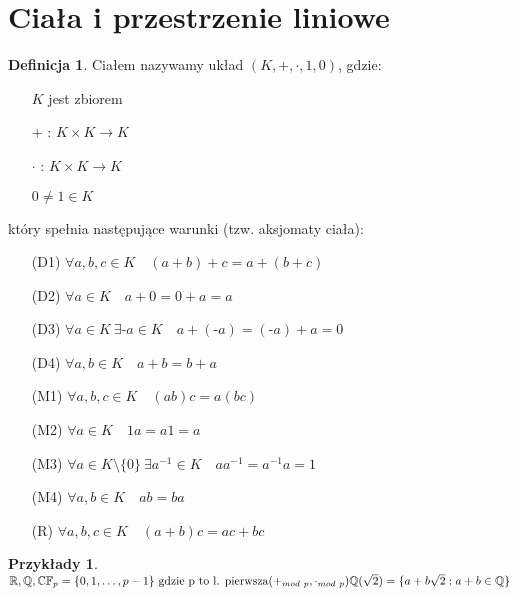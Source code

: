 \documentclass[12pt,a4paper]{article}
\newcommand{\RR}{\mathbb{R}}
\theoremstyle{plain}
\theoremstyle{definition}
\theoremstyle{definition}
\newtheorem{df}{Definicja}[section]
\theoremstyle{definition}
\theoremstyle{definition}
\theoremstyle{definition}
\theoremstyle{definition}
\newtheorem*{przy}{Przykłady}
\theoremstyle{definition}
\begin{document}
\section{Ciała i przestrzenie liniowe}

\begin{df} 
Ciałem nazywamy układ $(K, + ,\cdot,1,0)$, gdzie:
    \begin{itemize} 
        \item[] $K$ jest zbiorem
        \item[+]: $K \times K \rightarrow K$
        \item[$\cdot$]: $K \times K \rightarrow K$
        \item[] $0 \neq 1 \in K$ 
    \end{itemize} 
    który spełnia następujące warunki (tzw. aksjomaty ciała):
    \begin{itemize}
        \item[(D1)] $\forall a, b, c \in K  \quad (a+b)+c = a+(b+c)$
        \item[(D2)] $\forall a \in K \quad a+0 = 0+a = a$
        \item[(D3)] $\forall a \in K \ \exists \text{-}a \in K \quad a + (\text{-}a) = (\text{-}a) + a = 0$
        \item[(D4)] $\forall a, b \in K \quad a+b = b+a$
        \item[(M1)] $\forall a, b, c \in K \quad (ab)c = a(bc) $
        \item[(M2)] $\forall a \in K \quad 1a = a1 = a$
        \item[(M3)] $\forall a \in K \setminus \{0\} \ \exists a^{-1} \in K \quad aa^{-1} = a^{-1}a = 1$
        \item[(M4)] $\forall a, b \in K \quad ab = ba$
        \item[(R)] $ \forall a,b, c \in K \quad (a+b)c = ac + bc $
    \end{itemize}
\end{df}

\begin{przy} 
    ~\\
    $ \RR, \mathbb{Q}, \mathbb{C} \\ 
    \mathbb{F}_p = \{0, 1, \dots, p-1\} \text{ gdzie p to l. pierwsza} (+_{mod\ p}, \cdot_{mod\ p})\\ 
    \mathbb{Q}(\sqrt{2}) = \{a+b\sqrt{2} : a+b \in \mathbb{Q}\}$
\end{przy}
\end{document}
